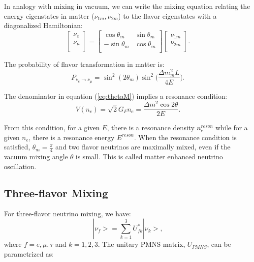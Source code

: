 In analogy with mixing in vacuum, we can write the mixing equation relating the energy eigenstates in matter ($\nu_{1m},\nu_{2m}$) to the flavor eigenstates with a diagonalized Hamiltonian:
\begin{equation}\label{eq:matter_mixing}
	\begin{bmatrix}
		\nu_e\\
		\nu_\mu\\
	\end{bmatrix}
	= \begin{bmatrix}
		\cos\theta_m & \sin\theta_m\\
		-\sin\theta_m & \cos\theta_m \\
	\end{bmatrix}
	\begin{bmatrix}
		\nu_{1m}\\
		\nu_{2m}\\
	\end{bmatrix}.
\end{equation}

The probability of flavor transformation in matter is:
\begin{equation}
	P_{\nu_e\to\nu_{\mu}}=\sin^2(2\theta_m)\sin^2\Big(\frac{\Delta m_m^2L}{4E}\Big).
\end{equation}

The denominator in equation (\ref{eq:thetaM}) implies a resonance condition:
\begin{equation}\label{eq:reson_condition}
	V(n_e)=\sqrt 2G_Fn_e=\frac{\Delta m^2\cos2\theta}{2E}.
\end{equation}

From this condition, for a given $E$, there is a resonance density $n^{reson}_e$ while for a given $n_e$, there is a resonance energy $E^{reson}$. When the resonance condition is satisfied, $\theta_m = \frac{\pi}{4}$ and two flavor neutrinos are maximally mixed, even if the vacuum mixing angle $\theta$ is small. This is called matter enhanced neutrino oscillation\cite{smirnov2016solar,fukugita2013physics}.

\subsection{Three-flavor Mixing}

For three-flavor neutrino mixing, we have\cite{pdg2018}:
\begin{equation}\label{eq:mixingmatrix}
|\nu_f> = \sum_{k=1}^3U^*_{fk}|\nu_k>, 
\end{equation}
where $f=e,\mu,\tau$ and $k=1,2,3$. The unitary PMNS matrix, $U_{PMNS}$, can be parametrized as: 

